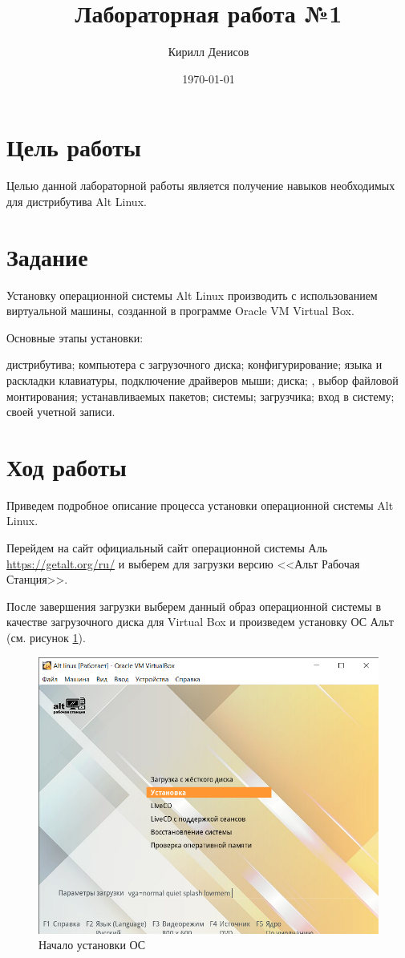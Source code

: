 \documentclass[a4paper,14pt]{extarticle}
\author{Кирилл Денисов}
\title{Лабораторная работа №1}
\date{\today}
\newcommand{\pathToCommonFolder}{/home/denilai/Documents/repos/latex/Common}
\begin{document}
	\thispagestyle{empty}
	
	\newpage
	
\normalsize

\section*{Цель работы}
Целью данной лабораторной работы является получение
навыков
необходимых
для
дистрибутива Alt Linux.

\section*{Задание}
Установку операционной системы Alt Linux производить с использованием виртуальной машины, созданной в программе Oracle VM Virtual Box.

Основные этапы установки:
\begin{itemize}
	 дистрибутива;
	 компьютера с загрузочного диска;
	 конфигурирование;
	 языка и раскладки клавиатуры, подключение
	драйверов мыши;
	 диска;
	,
	выбор
	файловой
	монтирования;
	 устанавливаемых пакетов;
	 системы;
	 загрузчика;
	 вход в систему;
	 своей учетной записи.
\end{itemize}

\section*{Ход работы}

Приведем подробное описание процесса установки операционной системы Alt Linux.

Перейдем на сайт  официальный сайт операционной системы Аль \href{https://getalt.org/ru/}{https://getalt.org/ru/} и выберем для загрузки версию <<Альт Рабочая Станция>>.

После завершения загрузки выберем данный образ операционной системы в качестве загрузочного диска для Virtual Box и произведем установку ОС Альт (см. рисунок \ref{fig:begin}).

\begin{figure}[h!]
	\centering
	\includegraphics[width=0.6\linewidth]{"images/Практика МИРЭА/Alt linux [Работает] - Oracle VM VirtualBox 18.03.2022 14_50_41"}
	\caption{Начало установки ОС}
	\label{fig:begin}
\end{figure}
\end{document}
